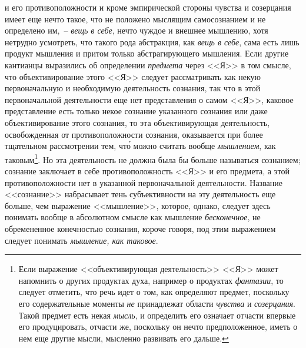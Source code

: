 и его противоположности и кроме эмпирической стороны
чувства и созерцания имеет еще нечто такое, что не положено
мыслящим самосознанием и не определено им,~--
\emph{вещь в себе}, нечто чуждое и внешнее мышлению, хотя
нетрудно усмотреть, что такого рода абстракция, как
\emph{вещь в себе}, сама есть лишь продукт мышления и притом
только абстрагирующего мышления. Если другие
кантианцы\endnotemark{} выразились об определении \emph{предмета} через
<<Я>> в том смысле, что объективирование этого <<Я>> следует
рассматривать как некую первоначальную и необходимую
деятельность сознания, так что в этой первоначальной
деятельности еще нет представления о самом
<<Я>>, каковое представление есть только некое сознание
указанного сознания или даже объективирование этого сознания,
то эта объективирующая деятельность, освобожденная
от противоположности сознания, оказывается при
более тщательном рассмотрении тем, чт\'о можно считать
вообще \emph{мышлением}, как таковым\footnote{Если выражение
  <<объективирующая деятельность>> <<Я>> может напомнить о
  других продуктах духа, например о продуктах \emph{фантазии},
  то следует отметить, что речь идет о том, как определяют
  предмет, поскольку его содержательные моменты \emph{не} принадлежат
  области \emph{чувства} и \emph{созерцания}. Такой предмет есть некая
  \emph{мысль}, и определить его означает отчасти впервые его продуцировать,
  отчасти же, поскольку он нечто предположенное, иметь
  о нем еще другие мысли, мысленно развивать его дальше.}. Но эта деятельность
не должна была бы больше называться сознанием; сознание
заключает в себе противоположность <<Я>> и его
предмета, а этой противоположности нет в указанной
первоначальной деятельности. Название <<сознание>> набрасывает
тень субъективности на эту деятельность еще
больше, чем выражение <<мышление>>, которое, однако,
следует здесь понимать вообще в абсолютном смысле как
мышление \emph{бесконечное}, не обремененное конечностью сознания,
короче говоря, под этим выражением следует
понимать \emph{мышление, как таковое}.


